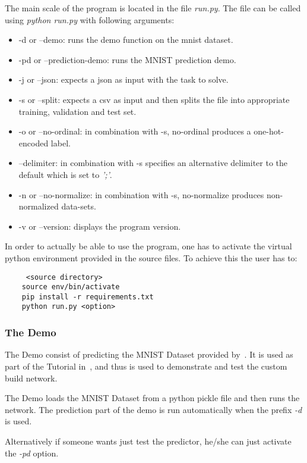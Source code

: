 \documentclass[12pt]{article}
\begin{document}
The main scale of the program is located in the file \textit{run.py}. The file can be called using \textit{python run.py} with following arguments:
\begin{itemize}
    \item -d or --demo: runs the demo function on the \gls{mnist} dataset.
    \item -pd or --prediction-demo: runs the MNIST prediction demo.
    \item -j or --json: expects a \gls{json} as input with the task to solve.
    \item -s or --split: expects a \gls{csv} as input and then splits the file into appropriate training, validation and test set.
    \item -o or --no-ordinal: in combination with -s, no-ordinal produces a one-hot-encoded label.
    \item --delimiter: in combination with -s specifies an alternative delimiter to the default which is set to \textit{';'}.
    \item -n or --no-normalize: in combination with -s, no-normalize produces non-normalized data-sets.
    \item -v or --version: displays the program version.
\end{itemize}

In order to actually be able to use the program, one has to activate the virtual python environment provided in the source files. To achieve this the user has to:
\begin{verbatim}
     <source directory>
    source env/bin/activate
    pip install -r requirements.txt
    python run.py <option>
\end{verbatim}

\subsubsection{The Demo}
\label{subsub:demo}
The Demo consist of predicting the MNIST Dataset provided by~\citet{MNISTSite}. It is used as part of the Tutorial in~\citet{theanoTutorial}, and thus is used to demonstrate and test the custom build network. 

The Demo loads the MNIST Dataset from a python pickle file and then runs the network. The prediction part of the demo is run automatically when the prefix \emph{-d} is used. 

Alternatively if someone wants just test the predictor, he/she can just activate the \emph{-pd} option.
\end{document}
